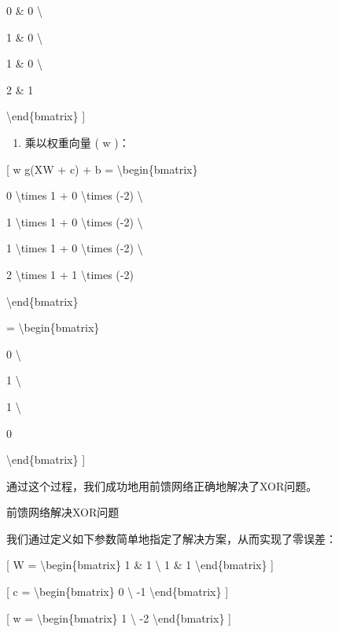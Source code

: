 0 \& 0 \textbackslash{}

1 \& 0 \textbackslash{}

1 \& 0 \textbackslash{}

2 \& 1

\textbackslash end\{bmatrix\} {]}


\begin{enumerate}
\def\labelenumi{\arabic{enumi}.}
\item
  乘以权重向量 ( w )：
\end{enumerate}

{[} w g(XW + c) + b = \textbackslash begin\{bmatrix\}

0 \textbackslash times 1 + 0 \textbackslash times (-2) \textbackslash{}

1 \textbackslash times 1 + 0 \textbackslash times (-2) \textbackslash{}

1 \textbackslash times 1 + 0 \textbackslash times (-2) \textbackslash{}

2 \textbackslash times 1 + 1 \textbackslash times (-2)

\textbackslash end\{bmatrix\}

= \textbackslash begin\{bmatrix\}

0 \textbackslash{}

1 \textbackslash{}

1 \textbackslash{}

0

\textbackslash end\{bmatrix\} {]}


通过这个过程，我们成功地用前馈网络正确地解决了XOR问题。

前馈网络解决XOR问题

我们通过定义如下参数简单地指定了解决方案，从而实现了零误差：

{[} W = \textbackslash begin\{bmatrix\} 1 \& 1 \textbackslash{} 1 \& 1
\textbackslash end\{bmatrix\} {]}

{[} c = \textbackslash begin\{bmatrix\} 0 \textbackslash{} -1
\textbackslash end\{bmatrix\} {]}

{[} w = \textbackslash begin\{bmatrix\} 1 \textbackslash{} -2
\textbackslash end\{bmatrix\} {]}

